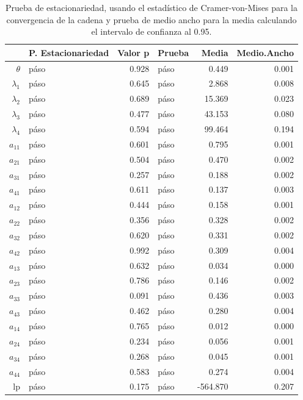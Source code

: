 \documentclass[a4paper]{article}\usepackage[]{graphicx}\usepackage[]{color}
\begin{document}
\begin{table}[ht]
\centering
\begin{tabular}{rlrlrr}
  \hline
 & P. Estacionariedad & Valor p & Prueba & Media & Medio.Ancho \\ 
  \hline
$\theta$ & páso & 0.928 & páso & 0.449 & 0.001 \\ 
  $\lambda_1$ & páso & 0.645 & páso & 2.868 & 0.008 \\ 
  $\lambda_2$ & páso & 0.689 & páso & 15.369 & 0.023 \\ 
  $\lambda_3$ & páso & 0.477 & páso & 43.153 & 0.080 \\ 
  $\lambda_4$ & páso & 0.594 & páso & 99.464 & 0.194 \\ 
  $a_{11}$ & páso & 0.601 & páso & 0.795 & 0.001 \\ 
  $a_{21}$ & páso & 0.504 & páso & 0.470 & 0.002 \\ 
  $a_{31}$ & páso & 0.257 & páso & 0.188 & 0.002 \\ 
  $a_{41}$ & páso & 0.611 & páso & 0.137 & 0.003 \\ 
  $a_{12}$ & páso & 0.444 & páso & 0.158 & 0.001 \\ 
  $a_{22}$ & páso & 0.356 & páso & 0.328 & 0.002 \\ 
  $a_{32}$ & páso & 0.620 & páso & 0.331 & 0.002 \\ 
  $a_{42}$ & páso & 0.992 & páso & 0.309 & 0.004 \\ 
  $a_{13}$ & páso & 0.632 & páso & 0.034 & 0.000 \\ 
  $a_{23}$ & páso & 0.786 & páso & 0.146 & 0.002 \\ 
  $a_{33}$ & páso & 0.091 & páso & 0.436 & 0.003 \\ 
  $a_{43}$ & páso & 0.462 & páso & 0.280 & 0.004 \\ 
  $a_{14}$ & páso & 0.765 & páso & 0.012 & 0.000 \\ 
  $a_{24}$ & páso & 0.234 & páso & 0.056 & 0.001 \\ 
  $a_{34}$ & páso & 0.268 & páso & 0.045 & 0.001 \\ 
  $a_{44}$ & páso & 0.583 & páso & 0.274 & 0.004 \\ 
  lp & páso & 0.175 & páso & -564.870 & 0.207 \\ 
   \hline
\end{tabular}
\caption{Prueba de estacionariedad, usando el estadístico de Cramer-von-Mises para la convergencia de la cadena y prueba de medio ancho para la media calculando el intervalo de confianza al 0.95.} 
\end{table}
\end{document}
